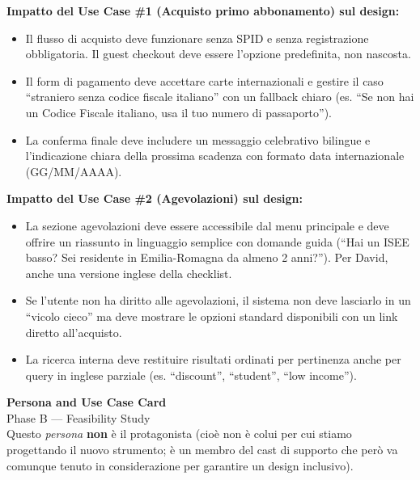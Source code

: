 \documentclass[11pt,a4paper]{article}
\begin{document}
\vspace{0.3cm}

\begin{tcolorbox}[colback=backgroundColor,colframe=borderColor,arc=2mm]
    {\small
    \textbf{Impatto del Use Case \#1 (Acquisto primo abbonamento) sul design:} \\[4pt]
    \begin{itemize}[leftmargin=*]
        \item Il flusso di acquisto deve funzionare senza SPID e senza registrazione obbligatoria. Il guest checkout deve essere l'opzione predefinita, non nascosta.
        \item Il form di pagamento deve accettare carte internazionali e gestire il caso ``straniero senza codice fiscale italiano'' con un fallback chiaro (es. ``Se non hai un Codice Fiscale italiano, usa il tuo numero di passaporto'').
        \item La conferma finale deve includere un messaggio celebrativo bilingue e l'indicazione chiara della prossima scadenza con formato data internazionale (GG/MM/AAAA).
    \end{itemize}
    \vspace{0.2cm}
    \textbf{Impatto del Use Case \#2 (Agevolazioni) sul design:} \\[4pt]
    \begin{itemize}[leftmargin=*]
        \item La sezione agevolazioni deve essere accessibile dal menu principale e deve offrire un riassunto in linguaggio semplice con domande guida (``Hai un ISEE basso? Sei residente in Emilia-Romagna da almeno 2 anni?''). Per David, anche una versione inglese della checklist.
        \item Se l'utente non ha diritto alle agevolazioni, il sistema non deve lasciarlo in un ``vicolo cieco'' ma deve mostrare le opzioni standard disponibili con un link diretto all'acquisto.
        \item La ricerca interna deve restituire risultati ordinati per pertinenza anche per query in inglese parziale (es. ``discount'', ``student'', ``low income'').
    \end{itemize}
    }
\end{tcolorbox}

\vspace{0.5cm}

\begin{center}
    {\color{primaryColor}\Large\bfseries Persona and Use Case Card} \\[4pt]
    {\color{secondaryColor}\normalsize Phase B --- Feasibility Study} \\[4pt]
    {\color{secondaryColor}\small Questo \textit{persona} \textbf{non} \`e il protagonista (cio\`e non \`e colui per cui stiamo progettando il nuovo strumento; \`e un membro del cast di supporto che per\`o va comunque tenuto in considerazione per garantire un design inclusivo).}
\end{center}
\end{document}
